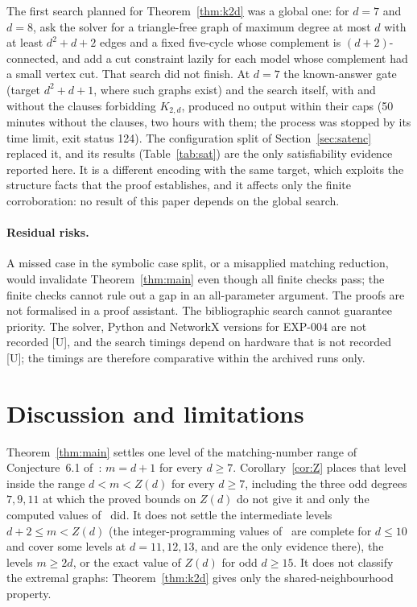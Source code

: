 \documentclass[11pt]{article}
\theoremstyle{remark}
\begin{document}
The first search planned for Theorem~\ref{thm:k2d} was a global one: for $d=7$ and $d=8$, ask the solver for a triangle-free graph of maximum degree at most $d$ with at least $d^2+d+2$ edges and a fixed five-cycle whose complement is $(d+2)$-connected, and add a cut constraint lazily for each model whose complement had a small vertex cut. That search did not finish. At $d=7$ the known-answer gate (target $d^2+d+1$, where such graphs exist) and the search itself, with and without the clauses forbidding $K_{2,d}$, produced no output within their caps (50 minutes without the clauses, two hours with them; the process was stopped by its time limit, exit status 124). The configuration split of Section~\ref{sec:satenc} replaced it, and its results (Table~\ref{tab:sat}) are the only satisfiability evidence reported here. It is a different encoding with the same target, which exploits the structure facts that the proof establishes, and it affects only the finite corroboration: no result of this paper depends on the global search.

\paragraph{Residual risks.}

A missed case in the symbolic case split, or a misapplied matching reduction, would invalidate Theorem~\ref{thm:main} even though all finite checks pass; the finite checks cannot rule out a gap in an all-parameter argument. The proofs are not formalised in a proof assistant. The bibliographic search cannot guarantee priority. The solver, Python and NetworkX versions for EXP-004 are not recorded [U], and the search timings depend on hardware that is not recorded [U]; the timings are therefore comparative within the archived runs only.

\section{Discussion and limitations}\label{sec:disc}

Theorem~\ref{thm:main} settles one level of the matching-number range of Conjecture~6.1 of~\cite{AEY}: $m=d+1$ for every $d\ge7$. Corollary~\ref{cor:Z} places that level inside the range $d<m<Z(d)$ for every $d\ge7$, including the three odd degrees $7,9,11$ at which the proved bounds on $Z(d)$ do not give it and only the computed values of~\cite{BET} did. It does not settle the intermediate levels $d+2\le m<Z(d)$ (the integer-programming values of~\cite{BET} are complete for $d\le10$ and cover some levels at $d=11,12,13$, and are the only evidence there), the levels $m\ge2d$, or the exact value of $Z(d)$ for odd $d\ge15$. It does not classify the extremal graphs: Theorem~\ref{thm:k2d} gives only the shared-neighbourhood property.
\end{document}
